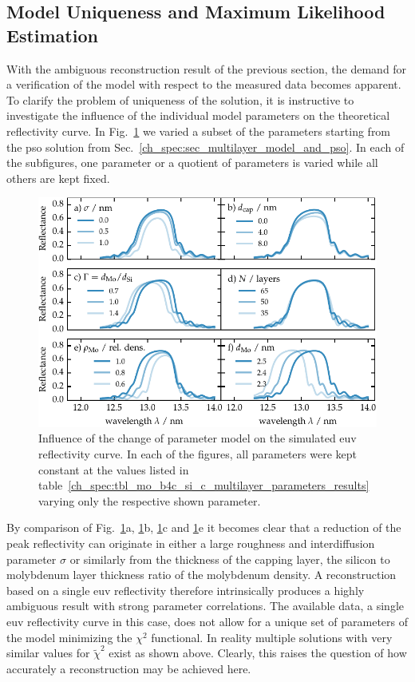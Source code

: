 \subsection{Model Uniqueness and Maximum Likelihood Estimation}  \label{ch_spec:sec_maximum_likelihood}
With the ambiguous reconstruction result of the previous section, the demand for a verification of the model with respect to the measured data becomes apparent. To clarify the problem of uniqueness of the solution, it is instructive to investigate the influence of the individual model parameters on the theoretical reflectivity curve. In Fig.~\ref{ch_spec:fig_mo_si_parameter_influence} we varied a subset of the parameters starting from the \gls{pso} solution from Sec.~\ref{ch_spec:sec_multilayer_model_and_pso}. In each of the subfigures, one parameter or a quotient of parameters is varied while all others are kept fixed.
\begin{figure}[htbp]
\centering
\includegraphics{img/parameter_influence}
\caption{Influence of the change of parameter model on the simulated \gls{euv} reflectivity curve. In each of the figures, all parameters were kept constant at the values listed in table~\ref{ch_spec:tbl_mo_b4c_si_c_multilayer_parameters_results} varying only the respective shown parameter.}
\label{ch_spec:fig_mo_si_parameter_influence}
\end{figure}
By comparison of Fig.~\ref{ch_spec:fig_mo_si_parameter_influence}a, \ref{ch_spec:fig_mo_si_parameter_influence}b, \ref{ch_spec:fig_mo_si_parameter_influence}c and \ref{ch_spec:fig_mo_si_parameter_influence}e it becomes clear that a reduction of the peak reflectivity can originate in either a large roughness and interdiffusion parameter $\sigma$ or similarly from the thickness of the capping layer, the silicon to molybdenum layer thickness ratio of the molybdenum density. A reconstruction based on a single \gls{euv} reflectivity therefore intrinsically produces a highly ambiguous result with strong parameter correlations. The available data, a single \gls{euv} reflectivity curve in this case, does not allow for a unique set of parameters of the model minimizing the $\chi^2$ functional. In reality multiple solutions with very similar values for $\tilde{\chi}^2$ exist as shown above. Clearly, this raises the question of how accurately a reconstruction may be achieved here.

